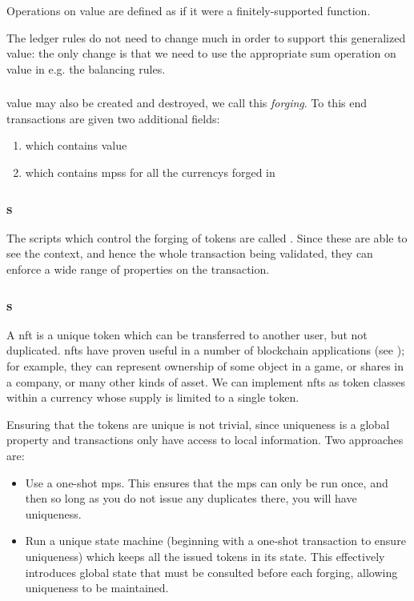 Operations on \gls{value} are defined as if it were a finitely-supported function.

The ledger rules do not need to change much in order to support this generalized \gls{value}: the only change is that we need to use the appropriate sum operation on \gls{value} in e.g. the balancing rules.

\subsubsection{}
\label{sec:forging}
\Gls{value} may also be created and destroyed, we call this \emph{\gls{forging}}.
To this end transactions are given two additional fields:
\begin{enumerate}
\item {} which contains \gls{value}
\item {} which contains \glspl{mps} for all the \glspl{currency} forged in 
\end{enumerate}

\subsubsection{s}
The \glspl{script} which control the forging of \glspl{token} are called .
Since these are able to see the \gls{context}, and hence the whole transaction being validated, they can enforce a wide range of properties on the transaction.

\subsubsection{s}
A \gls{nft} is a unique \gls{token} which can be transferred to another user, but not duplicated.
\Glspl{nft} have proven useful in a number of blockchain applications (see \textcite{ERC-721}); for example, they can represent ownership of some object in a game, or shares in a company, or many other kinds of asset.
We can implement \glspl{nft} as token classes within a \gls{currency} whose supply is limited to a single \gls{token}.

Ensuring that the tokens are unique is not trivial, since uniqueness is a global property and transactions only have access to local information.
Two approaches are:
\begin{itemize}
\item
  Use a \gls{one-shot} \gls{mps}.
  This ensures that the \gls{mps} can only be run once, and then so long as you do not issue any duplicates there, you will have uniqueness.
\item
  Run a unique state machine (beginning with a \gls{one-shot} transaction to ensure uniqueness) which keeps all the issued tokens in its state.
  This effectively introduces global state that must be consulted before each forging, allowing uniqueness to be maintained.
\end{itemize}


